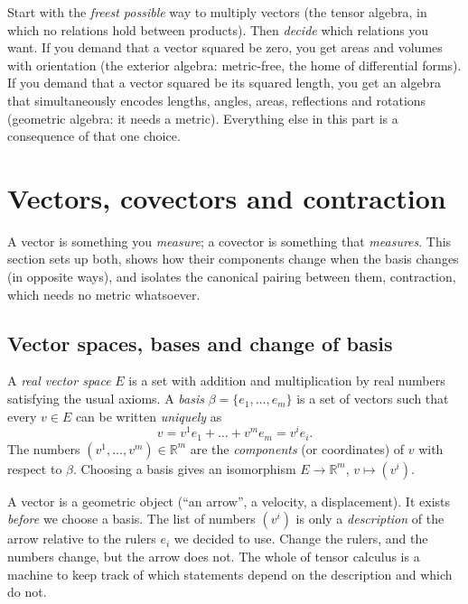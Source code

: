 \documentclass[11pt,a4paper]{article}
\numberwithin{equation}{section}
\theoremstyle{definition}
\theoremstyle{plain}
\newcommand{\R}{\mathbb{R}}
\begin{document}
\begin{intuition}
Start with the \emph{freest possible} way to multiply vectors (the tensor algebra, in which no relations hold between
products). Then \emph{decide} which relations you want. If you demand that a vector squared be zero, you get areas and
volumes with orientation (the exterior algebra: metric-free, the home of differential forms). If you demand that a vector
squared be its squared length, you get an algebra that simultaneously encodes lengths, angles, areas, reflections and
rotations (geometric algebra: it needs a metric). Everything else in this part is a consequence of that one choice.
\end{intuition}

\section{Vectors, covectors and contraction}\label{sec:vectors}

A vector is something you \emph{measure}; a covector is something that \emph{measures}. This section sets up both,
shows how their components change when the basis changes (in opposite ways), and isolates the canonical pairing
between them, contraction, which needs no metric whatsoever.

\subsection{Vector spaces, bases and change of basis}\label{sec:vs}


\begin{formal}
A \emph{real vector space} $E$ is a set with addition and multiplication by real numbers satisfying the usual axioms. A \emph{basis} $\beta=\{e_1,\dots,e_m\}$ is a set of vectors such that every $v\in E$ can be written \emph{uniquely} as
\[
v=v^1e_1+\dots+v^me_m = v^ie_i .
\]
The numbers $(v^1,\dots,v^m)\in\R^m$ are the \emph{components} (or coordinates) of $v$ with respect to $\beta$. Choosing a basis gives an isomorphism $E\to\R^m$, $v\mapsto (v^i)$.
\end{formal}

\begin{intuition}
A vector is a geometric object (``an arrow'', a velocity, a displacement). It exists \emph{before} we choose a basis. The list of numbers $(v^i)$ is only a \emph{description} of the arrow relative to the rulers $e_i$ we decided to use. Change the rulers, and the numbers change, but the arrow does not. The whole of tensor calculus is a machine to keep track of which statements depend on the description and which do not.
\end{intuition}
\end{document}
